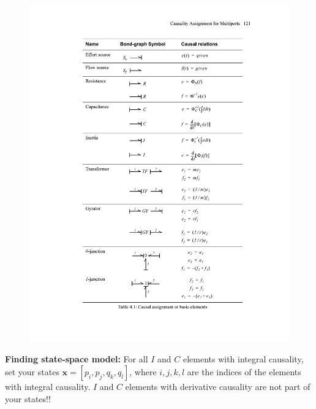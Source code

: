 \begin{figure}[H]
\begin{minipage}{.5\textwidth}
        \includegraphics[width=.9\linewidth]{figures/Tabell_CausalRelations.pdf}
        \label{fig:bond_graph3}
    \end{minipage}
\end{figure}
\textbf{Finding state-space model: }\newline
For all $I$ and $C$ elements with integral causality, set your states $\mathbf{x} = [p_i, p_j, q_k, q_l]$, where $i,j,k,l$ are the indices of the elements with integral causality. $I$ and $C$ elements with derivative causality are not part of your states!!
\newpage
